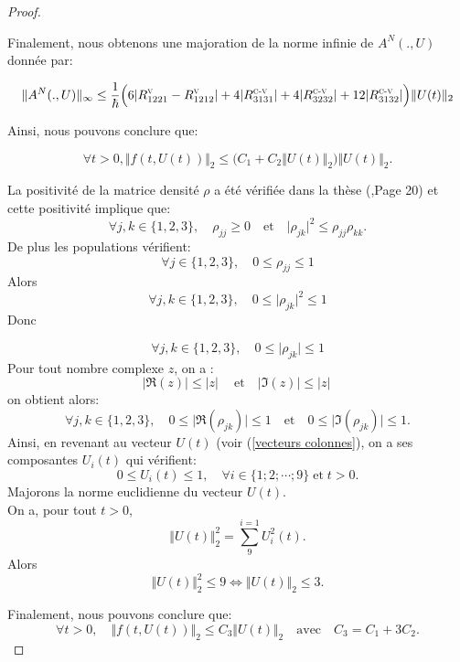 \documentclass[12pt,a4paper,openany,oneside]{book}
\begin{document}
{{{{{{\begin{proof}
\begin{enumerate}
\begin{itemize}[label=$\bullet$]
\end{itemize} 

Finalement, nous obtenons une  majoration de la norme infinie de $ A^{N}(.,U)$ donnée par:
 
$$ \Vert A^{N}(.,U) \Vert_{\infty}\leq \dfrac{1}{\hbar}\Big(6\vert R^{\textsc{v}}_{1221}-R^{\textsc{v}}_{1212}\vert + 4\vert R^{\textsc{c-v}}_{3131}\vert + 4\vert R^{\textsc{c-v}}_{3232}\vert + 12\vert R^{\textsc{c-v}}_{3132} \vert\Big )\Vert U(t)\Vert_{2} $$
 
 \end{enumerate}
 
Ainsi, nous pouvons conclure que:

$$\forall t>0, \Vert f(t,U(t))\Vert_{2}\leq \Big(C_{1}+C_{2}\Vert U(t)\Vert_{2}\Big)\Vert U(t)\Vert_{2}. $$

La positivité de la matrice densité $ \rho $ a été vérifiée dans la thèse (\cite{mareference1},Page 20) et cette positivité implique  que:
$$\forall j,k \in \{1,2,3\},\quad \rho_{jj}\geq 0 \quad \textrm{et} \quad \vert \rho_{jk}\vert^{2}\leq \rho_{jj}\rho_{kk}.$$
De plus les populations vérifient:
$$\forall j \in \{1,2,3\},\quad 0\leq\rho_{jj}\leq 1 $$
Alors 
$$ \forall j,k \in \{1,2,3\},\quad  0\leq\vert \rho_{jk}\vert^{2}\leq 1 $$
Donc

$$ \forall j,k \in \{1,2,3\},\quad  0\leq\vert \rho_{jk}\vert\leq 1 $$
Pour tout nombre complexe $z$, on a :
$$ \vert \Re(z)\vert\leq \vert z \vert\ \quad \textrm{et} \quad \vert \Im(z)\vert\leq \vert z \vert\ $$
on obtient alors:
$$ \forall j,k \in \{1,2,3\},\quad  0\leq\vert \Re(\rho_{jk})\vert\leq 1 \quad \textrm{et} \quad 0\leq\vert \Im(\rho_{jk})\vert\leq 1 .$$
Ainsi, en revenant au vecteur $U(t)$ (voir (\ref{vecteurs colonnes}), on a ses composantes $ U_{i}(t)$ qui vérifient:
$$0\leq U_{i}(t) \leq 1, \quad \forall i\in\{1;2;\cdots; 9\} \; \textrm{et}\; t>0 .$$
Majorons la norme euclidienne du vecteur $U(t)$.\\
On a, pour tout $t>0 $,
$$ \Vert U(t)\Vert_{2}^{2}=\sum^{i=1}_{9}U^{2}_{i}(t) .$$
Alors
$$ \Vert U(t)\Vert_{2}^{2} \leq 9 \Leftrightarrow \Vert U(t)\Vert_{2} \leq 3 .$$

Finalement, nous pouvons conclure que: 
$$\forall t>0,\quad \Vert f(t,U(t))\Vert_{2}\leq C_{3}\Vert U(t)\Vert_{2} \quad \textrm{avec}\quad C_{3}=C_{1}+3C_{2} .$$

\end{proof}

}}}}}}
\end{document}
